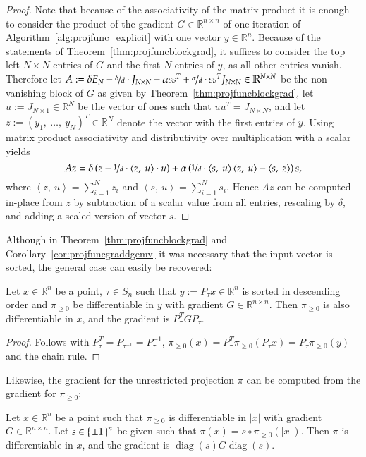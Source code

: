 \documentclass[twoside,11pt]{article}
\DeclareMathOperator{\hada}{\circ}
\DeclareMathOperator{\diag}{diag}
\newcommand{\tvect}[3]{\left(#1,\ #2,\ #3\right)\transp}
\newcommand{\tdvect}[2]{\tvect{#1}{\dots}{#2}}
\newcommand{\R}{\mathbb{R}}
\newcommand{\0}{\mathcal{O}}
\newcommand{\transp}{^T}
\newcommand{\abs}[1]{\left\vert #1 \right\vert}
\newcommand{\scp}[2]{\left<#1,\ #2\right>}
\begin{document}
\begin{proof}
Note that because of the associativity of the matrix product it is enough to consider the product of the gradient $G\in\R^{n\times n}$ of one iteration of Algorithm~\ref{alg:projfunc_explicit} with one vector $y\in\R^n$.
Because of the statements of Theorem~\ref{thm:projfuncblockgrad}, it suffices to consider the top left $N\times N$ entries of $G$ and the first $N$ entries of $y$, as all other entries vanish.
Therefore let $A := \delta E_N - \nicefrac{\delta}{d}\cdot J_{N\times N} -\alpha s s\transp + \nicefrac{\alpha}{d}\cdot s s\transp J_{N\times N}\in\R^{N\times N}$ be the non-vanishing block of $G$ as given by Theorem~\ref{thm:projfuncblockgrad}, let $u := J_{N\times 1}\in\R^N$ be the vector of ones such that $u u\transp = J_{N\times N}$, and let $z := \tdvect{y_1}{y_N}\in\R^N$ denote the vector with the first entries of $y$.
Using matrix product associativity and distributivity over multiplication with a scalar yields
\begin{displaymath}
  Az = \delta\left(z - \nicefrac{1}{d}\cdot\scp{z}{u} \cdot u\right) + \alpha\left(\nicefrac{1}{d}\cdot\scp{s}{u}\scp{z}{u}- \scp{s}{z}\right) s\text{,}
\end{displaymath}
where $\scp{z}{u} = \sum_{i=1}^N z_i$ and $\scp{s}{u} = \sum_{i=1}^N s_i$.
Hence $Az$ can be computed in-place from $z$ by subtraction of a scalar value from all entries, rescaling by $\delta$, and adding a scaled version of vector $s$.
\end{proof}
Although in Theorem~\ref{thm:projfuncblockgrad} and Corollary~\ref{cor:projfuncgraddgemv} it was necessary that the input vector is sorted, the general case can easily be recovered:
\begin{proposition}
\label{prop:projgrad_sorted}
Let $x\in\R^n$ be a point, $\tau\in S_n$ such that $y := P_\tau x\in\R^n$ is sorted in descending order and $\pi_{\geq 0}$ be differentiable in $y$ with gradient $G\in\R^{n\times n}$.
Then $\pi_{\geq 0}$ is also differentiable in $x$, and the gradient is $P_\tau\transp GP_\tau$.
\end{proposition}
\begin{proof}
Follows with $P_{\tau}\transp = P_{\tau^{-1}} = P_{\tau}^{-1}$, $\pi_{\geq 0}(x) = P_\tau\transp \pi_{\geq 0}(P_\tau x) = P_\tau \pi_{\geq 0}(y)$ and the chain rule.
\end{proof}
Likewise, the gradient for the unrestricted projection $\pi$ can be computed from the gradient for $\pi_{\geq 0}$:
\begin{proposition}
\label{prop:projgrad_reflective}
Let $x\in\R^n$ be a point such that $\pi_{\geq 0}$ is differentiable in $\abs{x}$ with gradient $G\in\R^{n\times n}$.
Let $s\in\set{\pm 1}^n$ be given such that $\pi(x) = s\hada\pi_{\geq 0}\left(\abs{x}\right)$.
Then $\pi$ is differentiable in $x$, and the gradient is $\diag(s) G \diag(s)$.
\end{proposition}
\end{document}
